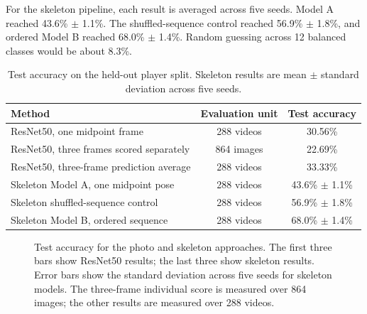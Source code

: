 \documentclass[12pt,a4paper]{article}
\begin{document}
For the skeleton pipeline, each result is averaged across five seeds. Model A reached 43.6\% $\pm$ 1.1\%. The shuffled-sequence control reached 56.9\% $\pm$ 1.8\%, and ordered Model B reached 68.0\% $\pm$ 1.4\%. Random guessing across 12 balanced classes would be about 8.3\%.

\begin{table}[H]
\centering
\caption{Test accuracy on the held-out player split. Skeleton results are mean $\pm$ standard deviation across five seeds.}
\label{tab:test}
\begin{tabular}{lcc}
\toprule
\textbf{Method} & \textbf{Evaluation unit} & \textbf{Test accuracy} \\
\midrule
ResNet50, one midpoint frame & 288 videos & 30.56\% \\
ResNet50, three frames scored separately & 864 images & 22.69\% \\
ResNet50, three-frame prediction average & 288 videos & 33.33\% \\
Skeleton Model A, one midpoint pose & 288 videos & 43.6\% $\pm$ 1.1\% \\
Skeleton shuffled-sequence control & 288 videos & 56.9\% $\pm$ 1.8\% \\
Skeleton Model B, ordered sequence & 288 videos & 68.0\% $\pm$ 1.4\% \\
\bottomrule
\end{tabular}
\end{table}


\begin{figure}[H]
\centering
{}
\caption{Test accuracy for the photo and skeleton approaches. The first three bars show ResNet50 results; the last three show skeleton results. Error bars show the standard deviation across five seeds for skeleton models. The three-frame individual score is measured over 864 images; the other results are measured over 288 videos.}
\label{fig:test-bars}
\end{figure}
\end{document}
